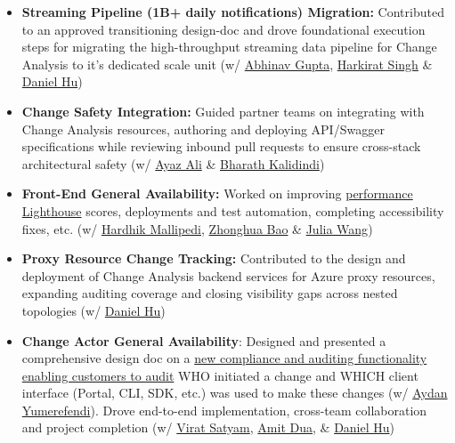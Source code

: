 \documentclass[a4paper,11pt]{article}
\begin{document}
    \begin{itemize}[label=\tiny$\circ$, leftmargin=1em, itemsep=1.0mm]
    \item \textbf{Streaming Pipeline (1B+ daily notifications) Migration:} Contributed to an approved transitioning design-doc and drove foundational execution steps for migrating the high-throughput streaming data pipeline for Change Analysis to it's dedicated scale unit (w/ \href{https://www.linkedin.com/in/abhinavgupta16/}{Abhinav Gupta}, \href{https://www.linkedin.com/in/harkirat-singh-59734512/}{Harkirat Singh} \& \href{https://www.linkedin.com/in/dhu5432/}{Daniel Hu})
    \item \textbf{Change Safety Integration:} Guided partner teams on integrating with Change Analysis resources, authoring and deploying API/Swagger specifications while reviewing inbound pull requests to ensure cross-stack architectural safety (w/ \href{https://www.linkedin.com/in/ayazali/}{Ayaz Ali} \& \href{https://www.linkedin.com/in/bharath-kalidindi-ab20a4107/}{Bharath Kalidindi})
    \item \textbf{Front-End General Availability:} Worked on improving \href{https://developer.chrome.com/docs/lighthouse/overview}{performance Lighthouse} scores, deployments and test automation, completing accessibility fixes, etc. (w/ \href{https://www.linkedin.com/in/hardhik/}{Hardhik Mallipedi}, \href{https://www.linkedin.com/in/zhonghua-bao-b84146172/}{Zhonghua Bao} \& \href{https://www.linkedin.com/in/juliamwang/}{Julia Wang})
    \item \textbf{Proxy Resource Change Tracking:} Contributed to the design and deployment of Change Analysis backend services for Azure proxy resources, expanding auditing coverage and closing visibility gaps across nested topologies (w/ \href{https://www.linkedin.com/in/dhu5432/}{Daniel Hu})
    \item \textbf{Change Actor General Availability}: Designed and presented a comprehensive design doc on a \href{https://techcommunity.microsoft.com/blog/azuregovernanceandmanagementblog/announcing-the-general-availability-of-change-actor/4171801}{new compliance and auditing functionality enabling customers to audit} WHO initiated a change and WHICH client interface (Portal, CLI, SDK, etc.) was used to make these changes (w/ \href{https://www.linkedin.com/in/aydan-yumerefendi-631514/}{Aydan Yumerefendi}). Drove end-to-end implementation, cross-team collaboration and project completion (w/ \href{https://www.linkedin.com/in/virat-satyam-58498320/}{Virat Satyam}, \href{https://www.linkedin.com/in/amit-dua-2ab50b4/}{Amit Dua}, \& \href{https://www.linkedin.com/in/dhu5432/}{Daniel Hu})

\end{itemize}
\end{document}
